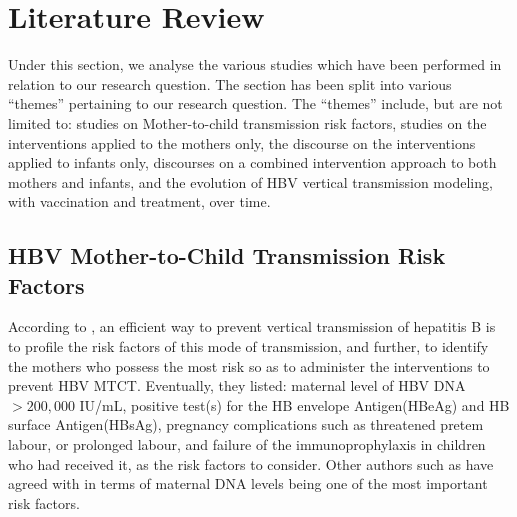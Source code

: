 \section{Literature Review}
Under this section, we analyse the various studies which have been performed in relation to our research question.  The section has been split into various ``themes'' pertaining to our research question. The ``themes'' include, but are not limited to: studies on Mother-to-child transmission risk factors, studies on the interventions applied to the mothers only, the discourse on the interventions applied to infants only, discourses on a combined intervention approach to both mothers and infants, and the evolution of HBV vertical transmission modeling, with vaccination and treatment, over time.


\subsection{HBV Mother-to-Child Transmission Risk Factors}
According to  \cite{Pan2012}, an efficient way to prevent vertical transmission of hepatitis B is to profile the risk factors of this mode of transmission, and further, to identify the mothers who possess the most risk so as to administer the interventions to prevent HBV MTCT. Eventually, they listed: maternal level of HBV DNA $>200,000$ IU/mL, positive test(s) for the HB envelope Antigen(HBeAg) and HB surface Antigen(HBsAg), pregnancy complications such as threatened pretem labour, or prolonged labour, and failure of the immunoprophylaxis in children who had received it, as the risk factors to consider. Other authors such as \cite{wen2013mother} have agreed with \cite{Pan2012} in terms of maternal DNA levels being one of the most important risk factors. 




